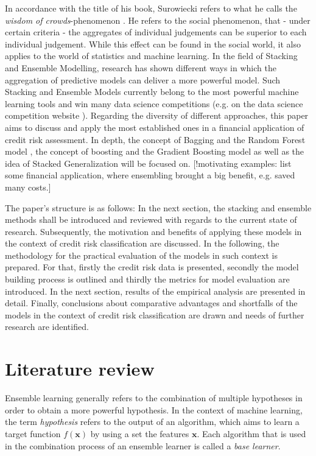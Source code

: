 \documentclass[12pt]{article}
\begin{document}
In accordance with the title of his book, Surowiecki refers to what he calls the \textit{wisdom of crowds}-phenomenon \cite{surowiecki2005wisdom}. He refers to the social phenomenon, that - under certain criteria - the aggregates of individual judgements can be superior to each individual judgement. While this effect can be found in the social world, it also applies to the world of statistics and machine learning. In the field of Stacking and Ensemble Modelling, research has shown different ways in which the aggregation of predictive models can deliver a more powerful model. Such Stacking and Ensemble Models currently belong to the most powerful machine learning tools and win many data science competitions (e.g. on the data science competition website \citeauthor{kaggle}). Regarding the diversity of different approaches, this paper aims to discuss and apply the most established ones in a financial application of credit risk assessment. In depth, the concept of Bagging and the Random Forest model \citep{breiman1996bagging, breiman2001random}, the concept of boosting and the Gradient Boosting model \cite{freund1996experiments, friedman2002stochastic} as well as the idea of Stacked Generalization \citep{wolpert1992stacked} will be focused on. [!motivating examples: list some financial application, where ensembling brought a big benefit, e.g. saved many costs.]

The paper's structure is as follows: In the next section, the stacking and ensemble methods shall be introduced and reviewed with regards to the current state of research. Subsequently, the motivation and benefits of applying these models in the context of credit risk classification are discussed. In the following, the methodology for the practical evaluation of the models in such context is prepared.  For that, firstly the credit risk data is presented, secondly the model building process is outlined and thirdly the metrics for model evaluation are introduced. In the next section, results of the empirical analysis are presented in detail. Finally, conclusions about comparative advantages and shortfalls of the models in the context of credit risk classification are drawn and needs of further research are identified.


\section{Literature review}
Ensemble learning generally refers to the combination of multiple hypotheses in order to obtain a more powerful hypothesis. In the context of machine learning, the term \textit{hypothesis} refers to the output of an algorithm, which aims to learn a target function $f(\mathbf{x})$ by using a set the features $\mathbf{x}$. Each algorithm that is used in the combination process of an ensemble learner is called a \textit{base learner}.
\end{document}
